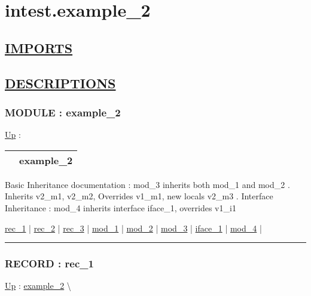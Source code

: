 \chapter*{intest.example\_2}
\hypertarget{ecldoc:toc:intest.example_2}{}

\section*{\underline{IMPORTS}}

\section*{\underline{DESCRIPTIONS}}
\subsection*{MODULE : example\_2}
\hypertarget{ecldoc:intest.example_2}{}
\hyperlink{ecldoc:toc:intest}{Up} :

{\renewcommand{\arraystretch}{1.5}
\begin{tabularx}{\textwidth}{|>{\raggedright\arraybackslash}l|X|}
\hline
\hspace{0pt} & example\_2 \\
\hline
\end{tabularx}
}

\par
Basic Inheritance documentation : mod\_3 inherits both mod\_1 and mod\_2 . Inherits v2\_m1, v2\_m2, Overrides v1\_m1, new locals v2\_m3 . Interface Inheritance : mod\_4 inherits interface iface\_1, overrides v1\_i1


\hyperlink{ecldoc:intest.example_2.rec_1}{rec\_1}  |
\hyperlink{ecldoc:intest.example_2.rec_2}{rec\_2}  |
\hyperlink{ecldoc:intest.example_2.rec_3}{rec\_3}  |
\hyperlink{ecldoc:intest.example_2.mod_1}{mod\_1}  |
\hyperlink{ecldoc:intest.example_2.mod_2}{mod\_2}  |
\hyperlink{ecldoc:intest.example_2.mod_3}{mod\_3}  |
\hyperlink{ecldoc:intest.example_2.iface_1}{iface\_1}  |
\hyperlink{ecldoc:intest.example_2.mod_4}{mod\_4}  |

\rule{\linewidth}{0.5pt}

\subsection*{RECORD : rec\_1}
\hypertarget{ecldoc:intest.example_2.rec_1}{}
\hyperlink{ecldoc:intest.example_2}{Up} :
\hspace{0pt} \hyperlink{ecldoc:intest.example_2}{example_2} \textbackslash 


